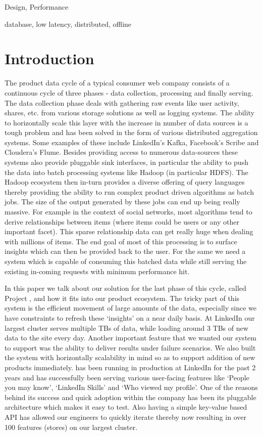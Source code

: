 \documentclass[10pt,twocolumn,preprint,nonatbib,numbers]{sigplanconf}
\begin{document}
\terms
Design, Performance

\keywords
database, low latency, distributed, offline


\section{Introduction}
\label{sec:introduction}
The product data cycle of a typical consumer web company consists of a continuous cycle of three phases - data collection, processing and finally serving. The data collection phase deals with gathering raw events like user activity, shares, etc. from various storage solutions as well as logging systems. The ability to horizontally scale this layer with the increase in number of data sources is a tough problem and has been solved in the form of various distributed aggregation systems. Some examples of these include LinkedIn's Kafka\cite{kafka}, Facebook's Scribe\cite{scribe} and Cloudera's Flume\cite{flume}. Besides providing access to numerous data-sources these systems also provide pluggable sink interfaces, in particular the ability to push the data into batch processing systems like Hadoop (in particular HDFS)\cite{hadoop}. The Hadoop ecosystem then in-turn provides a diverse offering of query languages thereby providing the ability to run complex product driven algorithms as batch jobs. The size of the output generated by these jobs can end up being really massive. For example in the context of social networks, most algorithms tend to derive relationships between items (where items could be users or any other important facet). This sparse relationship data can get really huge when dealing with millions of items. The end goal of most of this processing is to surface insights which can then be provided back to the user. For the same we need a system which is capable of consuming this batched data while still serving the existing in-coming requests with minimum performance hit. 

In this paper we talk about our solution for the last phase of this cycle, called Project \projectname{}, and how it fits into our product ecosystem. The tricky part of this system is the efficient movement of large amounts of the data, especially since we have constraints to refresh these `insights' on a near daily basis. At LinkedIn our largest cluster serves multiple TBs of data, while loading around 3 TBs of new data to the site every day. Another important feature that we wanted our system to support was the ability to deliver results under failure scenarios. We also built the system with horizontally scalability in mind so as to support addition of new products immediately. \projectname{} has been running in production at LinkedIn for the past 2 years and has successfully been serving various user-facing features like `People you may know', `LinkedIn Skills' and `Who viewed my profile'. One of the reasons behind its success and quick adoption within the company has been its pluggable architecture which makes it easy to test. Also having a simple key-value based API has allowed our engineers to quickly iterate thereby now resulting in over 100 features (stores) on our largest cluster.
\end{document}
